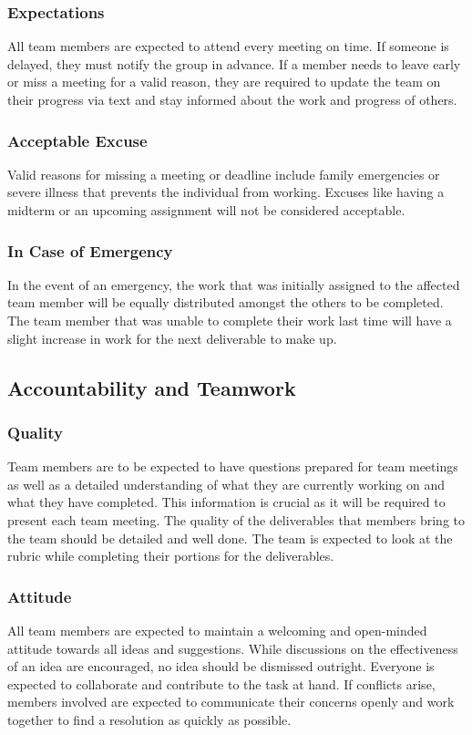 \documentclass{article}
\begin{document}
\subsubsection*{Expectations}
All team members are expected to attend every meeting on time. If someone is delayed, they must notify the group in advance. If a member needs to leave early or miss a meeting for a valid reason, they are required to update the team on their progress via text and stay informed about the work and progress of others.

\subsubsection*{Acceptable Excuse}
Valid reasons for missing a meeting or deadline include family emergencies or severe illness that prevents the individual from working. Excuses like having a midterm or an upcoming assignment will not be considered acceptable.

\subsubsection*{In Case of Emergency}
In the event of an emergency, the work that was initially assigned to the affected team member will be equally distributed amongst the others to be completed. The team member that was unable to complete their work last time will have a slight increase in work for the next deliverable to make up.


\subsection*{Accountability and Teamwork}

\subsubsection*{Quality} 
Team members are to be expected to have questions prepared for team meetings as well as a detailed understanding of what they are currently working on and what they have completed. This information is crucial as it will be required to present each team meeting. The quality of the deliverables that members bring to the team should be detailed and well done. The team is expected to look at the rubric while completing their portions for the deliverables.


\subsubsection*{Attitude}
All team members are expected to maintain a welcoming and open-minded attitude towards all ideas and suggestions. While discussions on the effectiveness of an idea are encouraged, no idea should be dismissed outright. Everyone is expected to collaborate and contribute to the task at hand. If conflicts arise, members involved are expected to communicate their concerns openly and work together to find a resolution as quickly as possible.
\end{document}
